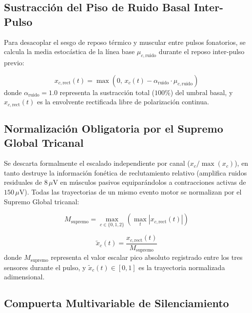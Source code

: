 \documentclass[11pt,a4paper,openany]{book}
\theoremstyle{definition}
\begin{document}
\subsection{Sustracción del Piso de Ruido Basal Inter-Pulso}
\label{subsec:sustraccion_ruido}

Para desacoplar el sesgo de reposo térmico y muscular entre pulsos fonatorios, se calcula la media estocástica de la línea base $\mu_{c,\text{ruido}}$ durante el reposo inter-pulso previo:

\begin{equation}
    x_{c,\text{rect}}(t) = \max\left(0,\, x_c(t) - \alpha_{\text{ruido}} \cdot \mu_{c,\text{ruido}}\right)
    \label{eq:sustraccion_ruido}
\end{equation}
donde $\alpha_{\text{ruido}} = 1.0$ representa la sustracción total ($100\%$) del umbral basal, y $x_{c,\text{rect}}(t)$ es la envolvente rectificada libre de polarización continua.

\subsection{Normalización Obligatoria por el Supremo Global Tricanal}
\label{subsec:supremo_global}

Se descarta formalmente el escalado independiente por canal ($x_c / \max(x_c)$), en tanto destruye la información fonética de reclutamiento relativo (amplifica ruidos residuales de $8\,\mu\text{V}$ en músculos pasivos equiparándolos a contracciones activas de $150\,\mu\text{V}$). Todas las trayectorias de un mismo evento motor se normalizan por el Supremo Global tricanal:

\begin{equation}
    M_{\text{supremo}} = \max_{c \in \{0, 1, 2\}} \left( \max_t |x_{c,\text{rect}}(t)| \right)
    \label{eq:supremo_global}
\end{equation}

\begin{equation}
    \tilde{x}_c(t) = \frac{x_{c,\text{rect}}(t)}{M_{\text{supremo}}}
    \label{eq:senial_normalizada}
\end{equation}
donde $M_{\text{supremo}}$ representa el valor escalar pico absoluto registrado entre los tres sensores durante el pulso, y $\tilde{x}_c(t) \in [0, 1]$ es la trayectoria normalizada adimensional.

\subsection{Compuerta Multivariable de Silenciamiento}
\label{subsec:compuerta_multivariable}
\end{document}
